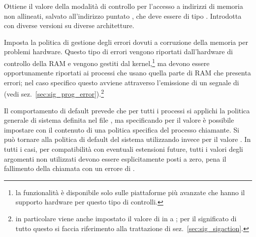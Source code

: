 \begin{basedescript}{\desclabelwidth{1.5cm}\desclabelstyle{\nextlinelabel}}
\item[\const{PR\_GET\_UNALIGN}] Ottiene il valore della modalità di controllo
  per l'accesso a indirizzi di memoria non allineati, salvato all'indirizzo
  puntato , che deve essere di tipo . Introdotta con
  diverse versioni su diverse architetture.
\item[\const{PR\_MCE\_KILL}] Imposta la politica di gestione degli errori
  dovuti a corruzione della memoria per problemi hardware. Questo tipo di
  errori vengono riportati dall'hardware di controllo della RAM e vengono
  gestiti dal kernel,\footnote{la funzionalità è disponibile solo sulle
    piattaforme più avanzate che hanno il supporto hardware per questo tipo di
    controlli.} ma devono essere opportunamente riportati ai processi che
  usano quella parte di RAM che presenta errori; nel caso specifico questo
  avviene attraverso l'emissione di un segnale di  (vedi
  sez.~\ref{sec:sig_prog_error}).\footnote{in particolare viene anche
    impostato il valore di  in  a
    ; per il significato di tutto questo si faccia
    riferimento alla trattazione di sez.~\ref{sec:sig_sigaction}.}

  Il comportamento di default prevede che per tutti i processi si applichi la
  politica generale di sistema definita nel file
  , ma specificando
  per  il valore  è possibile impostare
  con il contenuto di  una politica specifica del processo
  chiamante. Si può tornare alla politica di default del sistema utilizzando
  invece per  il valore . In tutti i
  casi, per compatibilità con eventuali estensioni future, tutti i valori
  degli argomenti non utilizzati devono essere esplicitamente posti a zero,
  pena il fallimento della chiamata con un errore di .
  

\end{basedescript}
